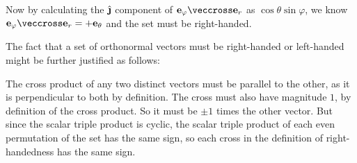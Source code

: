 \documentclass[fleqn,a4paper,11pt]{article}
\begin{document}
\begin{enumerate}
    Now by calculating the \(\uvecj\) component of
    \(\vec e_\varphi \veccross \vec e_r\) as
    \(\cos \theta \sin \varphi\), we know
    \(\vec e_\varphi \veccross \vec e_r = +\vec e_\theta\) and the set must be
    right-handed.

    The fact that a set of orthonormal vectors must be right-handed or
    left-handed might be further justified as follows:

    The cross product of any two distinct vectors must be parallel to the other,
    as it is perpendicular to both by definition. The cross must also have
    magnitude \(1\), by definition of the cross product. So it must be \(\pm 1\)
    times the other vector. But since the scalar triple product is cyclic, the
    scalar triple product of each even permutation of the set has the same sign,
    so each cross in the definition of right-handedness has the same sign.


\end{enumerate}
\end{document}
